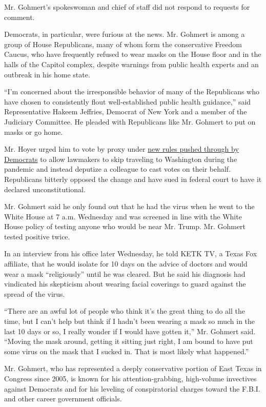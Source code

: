 Mr. Gohmert's spokeswoman and chief of staff did not respond to requests
for comment.

Democrats, in particular, were furious at the news. Mr. Gohmert is among
a group of House Republicans, many of whom form the conservative Freedom
Caucus, who have frequently refused to wear masks on the House floor and
in the halls of the Capitol complex, despite warnings from public health
experts and an outbreak in his home state.

``I'm concerned about the irresponsible behavior of many of the
Republicans who have chosen to consistently flout well-established
public health guidance,'' said Representative Hakeem Jeffries, Democrat
of New York and a member of the Judiciary Committee. He pleaded with
Republicans like Mr. Gohmert to put on masks or go home.

Mr. Hoyer urged him to vote by proxy under
\href{https://www.nytimes.com/2020/05/15/us/politics/remote-voting-house-coronavirus.html}{new
rules pushed through by Democrats} to allow lawmakers to skip traveling
to Washington during the pandemic and instead deputize a colleague to
cast votes on their behalf. Republicans bitterly opposed the change and
have sued in federal court to have it declared unconstitutional.

Mr. Gohmert said he only found out that he had the virus when he went to
the White House at 7 a.m. Wednesday and was screened in line with the
White House policy of testing anyone who would be near Mr. Trump. Mr.
Gohmert tested positive twice.

In an interview from his office later Wednesday, he told KETK TV, a
Texas Fox affiliate, that he would isolate for 10 days on the advice of
doctors and would wear a mask ``religiously'' until he was cleared. But
he said his diagnosis had vindicated his skepticism about wearing facial
coverings to guard against the spread of the virus.

``There are an awful lot of people who think it's the great thing to do
all the time, but I can't help but think if I hadn't been wearing a mask
so much in the last 10 days or so, I really wonder if I would have
gotten it,'' Mr. Gohmert said. ``Moving the mask around, getting it
sitting just right, I am bound to have put some virus on the mask that I
sucked in. That is most likely what happened.''

Mr. Gohmert, who has represented a deeply conservative portion of East
Texas in Congress since 2005, is known for his attention-grabbing,
high-volume invectives against Democrats and for his leveling of
conspiratorial charges toward the F.B.I. and other career government
officials.

